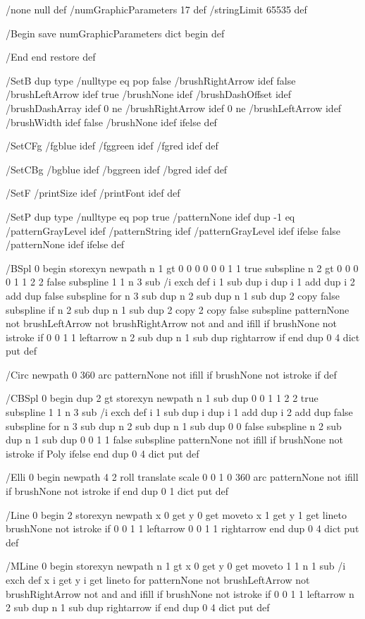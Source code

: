 /none null def
/numGraphicParameters 17 def
/stringLimit 65535 def

/Begin {
save
numGraphicParameters dict begin
} def

/End {
end
restore
} def

/SetB {
dup type /nulltype eq {
pop
false /brushRightArrow idef
false /brushLeftArrow idef
true /brushNone idef
} {
/brushDashOffset idef
/brushDashArray idef
0 ne /brushRightArrow idef
0 ne /brushLeftArrow idef
/brushWidth idef
false /brushNone idef
} ifelse
} def

/SetCFg {
/fgblue idef
/fggreen idef
/fgred idef
} def

/SetCBg {
/bgblue idef
/bggreen idef
/bgred idef
} def

/SetF {
/printSize idef
/printFont idef
} def

/SetP {
dup type /nulltype eq {
pop true /patternNone idef
} {
dup -1 eq {
/patternGrayLevel idef
/patternString idef
} {
/patternGrayLevel idef
} ifelse
false /patternNone idef
} ifelse
} def

/BSpl {
0 begin
storexyn
newpath
n 1 gt {
0 0 0 0 0 0 1 1 true subspline
n 2 gt {
0 0 0 0 1 1 2 2 false subspline
1 1 n 3 sub {
/i exch def
i 1 sub dup i dup i 1 add dup i 2 add dup false subspline
} for
n 3 sub dup n 2 sub dup n 1 sub dup 2 copy false subspline
} if
n 2 sub dup n 1 sub dup 2 copy 2 copy false subspline
patternNone not brushLeftArrow not brushRightArrow not and and { ifill } if
brushNone not { istroke } if
0 0 1 1 leftarrow
n 2 sub dup n 1 sub dup rightarrow
} if
end
} dup 0 4 dict put def

/Circ {
newpath
0 360 arc
patternNone not { ifill } if
brushNone not { istroke } if
} def

/CBSpl {
0 begin
dup 2 gt {
storexyn
newpath
n 1 sub dup 0 0 1 1 2 2 true subspline
1 1 n 3 sub {
/i exch def
i 1 sub dup i dup i 1 add dup i 2 add dup false subspline
} for
n 3 sub dup n 2 sub dup n 1 sub dup 0 0 false subspline
n 2 sub dup n 1 sub dup 0 0 1 1 false subspline
patternNone not { ifill } if
brushNone not { istroke } if
} {
Poly
} ifelse
end
} dup 0 4 dict put def

/Elli {
0 begin
newpath
4 2 roll
translate
scale
0 0 1 0 360 arc
patternNone not { ifill } if
brushNone not { istroke } if
end
} dup 0 1 dict put def

/Line {
0 begin
2 storexyn
newpath
x 0 get y 0 get moveto
x 1 get y 1 get lineto
brushNone not { istroke } if
0 0 1 1 leftarrow
0 0 1 1 rightarrow
end
} dup 0 4 dict put def

/MLine {
0 begin
storexyn
newpath
n 1 gt {
x 0 get y 0 get moveto
1 1 n 1 sub {
/i exch def
x i get y i get lineto
} for
patternNone not brushLeftArrow not brushRightArrow not and and { ifill } if
brushNone not { istroke } if
0 0 1 1 leftarrow
n 2 sub dup n 1 sub dup rightarrow
} if
end
} dup 0 4 dict put def

